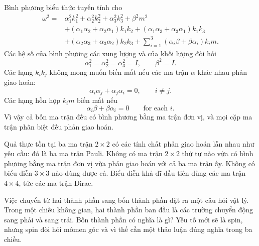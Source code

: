 Bình phương biểu thức tuyến tính cho
\begin{align}
\omega^2
={}&
\alpha_1^2k_1^2+\alpha_2^2k_2^2+\alpha_3^2k_3^2+\beta^2m^2
\nonumber\\
&+(\alpha_1\alpha_2+\alpha_2\alpha_1)k_1k_2
+(\alpha_1\alpha_3+\alpha_3\alpha_1)k_1k_3
\nonumber\\
&+(\alpha_2\alpha_3+\alpha_3\alpha_2)k_2k_3
+\sum_{i=1}^{3}(\alpha_i\beta+\beta\alpha_i)k_i m.
\end{align}
Các hệ số của bình phương các xung lượng và của khối lượng đòi hỏi
\begin{equation}
\alpha_1^2=\alpha_2^2=\alpha_3^2=I,
\qquad
\beta^2=I.
\end{equation}
Các hạng \(k_i k_j\) không mong muốn biến mất nếu các ma trận \(\alpha\) khác nhau phản giao hoán:
\begin{equation}
\alpha_i\alpha_j+\alpha_j\alpha_i=0,
\qquad i\neq j.
\end{equation}
Các hạng hỗn hợp \(k_i m\) biến mất nếu
\begin{equation}
\alpha_i\beta+\beta\alpha_i=0
\qquad
\text{for each }i.
\end{equation}
Vì vậy cả bốn ma trận đều có bình phương bằng ma trận đơn vị, và mọi cặp ma trận phân biệt đều phản giao hoán.

Quả thực tồn tại ba ma trận \(2\times2\) có các tính chất phản giao hoán lẫn nhau như yêu cầu: đó là ba ma trận Pauli. Không có ma trận \(2\times2\) thứ tư nào vừa có bình phương bằng ma trận đơn vị vừa phản giao hoán với cả ba ma trận ấy. Không có biểu diễn \(3\times3\) nào dùng được cả. Biểu diễn khả dĩ đầu tiên dùng các ma trận \(4\times4\), tức các ma trận Dirac.

Việc chuyển từ hai thành phần sang bốn thành phần đặt ra một câu hỏi vật lý. Trong một chiều không gian, hai thành phần ban đầu là các trường chuyển động sang phải và sang trái. Bốn thành phần có nghĩa là gì? Yếu tố mới sẽ là spin, nhưng spin đòi hỏi mômen góc và vì thế cần một thảo luận đúng nghĩa trong ba chiều.

